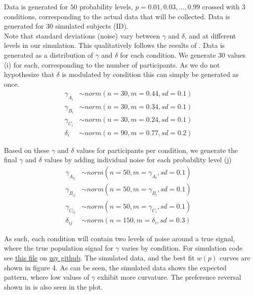 \documentclass[12pt]{article}
\begin{document}
Data is generated for $50$ probability levels,
$p = 0.01, 0.03,  \ldots, 0.99$ crossed with $3$
conditions, corresponding to the actual data
that will be collected.
Data is generated for $30$ simulated subjects (ID). \\

Note that standard deviations (noise) vary
between $\gamma$ and $\delta$, and at
different levels in our simulation. This qualitatively
follows the results of \textcite{gonzalez1999shape}.
Data is generated as a distribution of $\gamma$
and $\delta$ for each condition. We generate
$30$ values (i) for each, corresponding to the
number of participants. As we do not hypothesize
that $\delta$ is modulated by condition
this can simply be generated as once.
\begin{equation} \label{eq1}
\begin{split}
	\gamma_{A_{i}} &\sim norm(n = 30,
	m = 0.44, sd = 0.1) \\
	\gamma_{B_{i}} &\sim norm(n = 30,
	m = 0.34, sd = 0.1) \\
	\gamma_{C_{i}} &\sim norm(n = 30,
	m = 0.24, sd = 0.1) \\
	\delta_i &\sim norm(n = 90,
	m = 0.77, sd = 0.2)
\end{split}
\end{equation}

Based on these $\gamma$ and $\delta$ values for
participants per condition, we generate
the final $\gamma$ and $\delta$ values by
adding individual noise for each probability
level (j)
\begin{equation} \label{eq2}
\begin{split}
	\gamma_{A_{ij}} &\sim norm(n = 50,
	m = \gamma_{A_{i}}, sd = 0.1) \\
	\gamma_{B_{ij}} &\sim norm(n = 50,
	m = \gamma_{B_{i}}, sd = 0.1) \\
	\gamma_{C_{ij}} &\sim norm(n = 50,
	m = \gamma_{C_{i}}, sd = 0.1) \\
	\delta_{ij} &\sim norm(n = 150,
	m = \delta_{i}, sd = 0.3)
\end{split}
\end{equation}

As such, each condition will contain
two levels of noise around a true signal,
where the true population signal for
$\gamma$ varies by condition. For simulation
code see
\href{https://github.com/victor-m-p/BayesianDecisionWeights/blob/main/Code/1_simulate_data.Rmd}{this
file} on \href{https://github.com/victor-m-p/BayesianDecisionWeights}{my
github}.
The simulated data, and the best fit
$w(p)$ curves are shown in figure 4.
As can be seen, the simulated data shows
the expected pattern, where low values of
$\gamma$ exhibit more curvature. The preference
reversal shown in \textcite{rottenstreich2001money}
is also seen in the plot.
\end{document}
